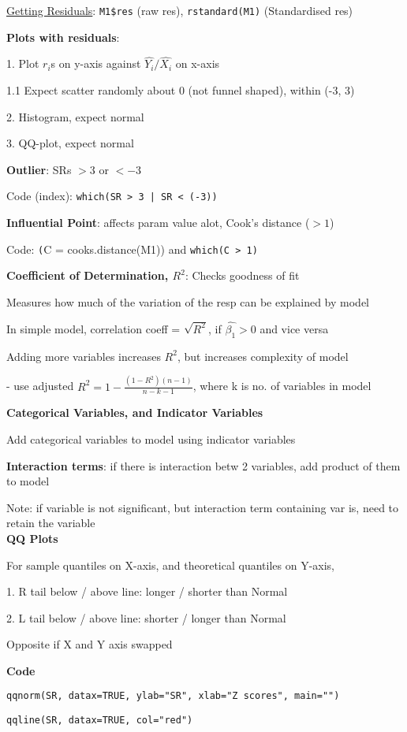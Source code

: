 \documentclass[10pt, a4paper]{article}
\newcommand{\red}[1]{{\color{red}#1}}
\newcommand{\header}[1]{{\normalsize\textbf{#1}}}
\newcommand{\tab}[0]{\hspace*{2mm}}
\begin{document}
\begin{multicols*}{3}
		\underline{Getting Residuals}: \texttt{M1\$res} (raw res), \texttt{rstandard(M1)} (Standardised res)

		\textbf{Plots with residuals}: 

		1. Plot $r_i$s on y-axis against $\hat{Y_i} / \hat{X_i}$ on x-axis

		\tab{} 1.1 Expect scatter randomly about 0 (not funnel shaped), within (-3, 3)

		2. Histogram, expect normal

		3. QQ-plot, expect normal

		\textbf{Outlier}: SRs $> 3$ or $ < -3$

		Code (index): \texttt{which(SR > 3 | SR < (-3))}

		\textbf{Influential Point}: affects param value alot, Cook's distance ($> 1$)

		Code: \texttt(C = cooks.distance(M1)) and \texttt{which(C > 1)}

		\textbf{Coefficient of Determination, $R^2$}: Checks goodness of fit

		Measures how much of the variation of the resp can be explained by model

		In simple model, correlation coeff = $\sqrt{R^2}$, if $\hat{\beta_1} > 0$ and vice versa
		
		Adding more variables increases $R^2$, but increases complexity of model

		\tab{} - use adjusted $R^2 = 1-\frac{(1-R^2)(n - 1)}{n - k - 1}$, where k is no. of variables in model

		\textbf{Categorical Variables, and Indicator Variables}

		Add categorical variables to model using indicator variables

		\textbf{Interaction terms}: if there is interaction betw 2 variables, add product of them to model

		\red{Note}: if variable is not significant, but interaction term containing var is, need to retain
		the variable\\

		\header{QQ Plots}

		For sample quantiles on X-axis, and theoretical quantiles on Y-axis,

		1. R tail below / above line: longer / shorter than Normal

		2. L tail below / above line: shorter / longer than Normal

		Opposite if X and Y axis swapped

		\textbf{Code}

		\texttt{qqnorm(SR, datax=TRUE, ylab="SR", xlab="Z scores", main="")}
		
		\texttt{qqline(SR, datax=TRUE, col="red")}



	\end{multicols*}
\end{document}
